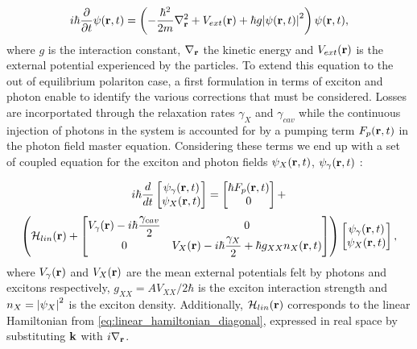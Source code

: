 \begin{equation}
     i\hbar \dfrac{\partial}{\partial t} \psi(\mathbf{r}, t) = \left( -\dfrac{\hbar^2}{2 m}\nabla_{\mathbf{r}}^2 + V_{ext}(\mathbf{r}) + \hbar g \abs{\psi(\mathbf{r}, t)}^2 \right) \psi(\mathbf{r}, t),
\label{GPE}
\end{equation}
where $g$ is the interaction constant, $\nabla_{\mathbf{r}}$ the kinetic energy and $V_{ext}(\mathbf{r})$ is the external potential experienced by the particles. To extend this equation to the out of equilibrium polariton case, a first formulation in 
terms of exciton and photon enable to identify the various corrections that must be considered.
Losses are incorportated through the relaxation rates $\gamma_X$ and $\gamma_{cav}$ while the continuous injection of photons in the system is accounted for by a pumping term $F_p(\mathbf{r},t)$ in the photon field master equation.
Considering these terms we end up with a set of coupled equation for the exciton and photon fields $\psi_X(\mathbf{r},t)$, $\psi_{\gamma}(\mathbf{r},t)$ :

\begin{equation}
    i\hbar \dfrac{d}{dt}
    \begin{bmatrix}
    \psi_{\gamma}(\mathbf{r}, t) \\
    \psi_{X}(\mathbf{r}, t)
    \end{bmatrix} 
    = 
    \begin{bmatrix}
    \hbar F_p(\mathbf{r}, t) \\
    0
    \end{bmatrix} +
\label{Schrödinger_uncoupled}
\end{equation}
\begin{align*}
    \left( \mathcal{H}_{lin}(\mathbf{r}) + 
    \begin{bmatrix}
    V_\gamma(\mathbf{r}) - i\hbar \dfrac{\gamma_{cav}}{2} & 0\\
    0 & V_X(\mathbf{r}) - i\hbar \dfrac{\gamma_{X}}{2} + \hbar g_{XX} n_{X}(\mathbf{r}, t)
    \end{bmatrix}
    \right)
    \begin{bmatrix}
    \psi_{\gamma}(\mathbf{r}, t) \\
    \psi_{X}(\mathbf{r}, t)
    \end{bmatrix},
\end{align*}    
where $V_\gamma(\mathbf{r})$ and $V_X(\mathbf{r})$ are the mean external potentials felt by photons and excitons respectively, $g_{XX} = A V_{XX}/2\hbar$ is the exciton interaction strength and $n_X = \abs{\psi_{X}}^2$ is the exciton density.  Additionally, $\mathcal{H}_{lin}(\mathbf{r})$ corresponds to the linear Hamiltonian from \autoref{eq:linear_hamiltonian_diagonal}, expressed in real space by substituting $\mathbf{k}$ with $i \nabla_{\mathbf{r}}$.

